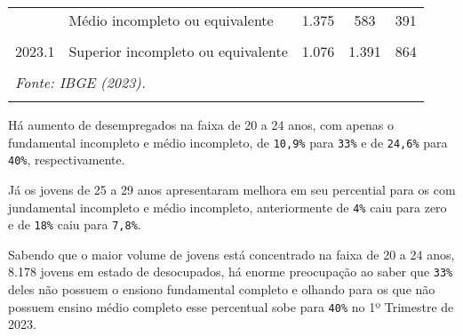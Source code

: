 \documentclass[preprint, 3p,
authoryear]{elsarticle} %
\begin{document}
\begin{longtable}[t]{clccc}
\addlinespace
2023.1 & Médio incompleto ou equivalente & 1.375 & 583 & 391\\
\cellcolor[HTML]{DCDCDC}{2023.1} & \cellcolor[HTML]{DCDCDC}{Médio completo ou equivalente} & \cellcolor[HTML]{DCDCDC}{2.855} & \cellcolor[HTML]{DCDCDC}{3.359} & \cellcolor[HTML]{DCDCDC}{2.817}\\
2023.1 & Superior incompleto ou equivalente & 1.076 & 1.391 & 864\\
\cellcolor[HTML]{DCDCDC}{2023.1} & \cellcolor[HTML]{DCDCDC}{Superior completo} & \cellcolor[HTML]{DCDCDC}{0} & \cellcolor[HTML]{DCDCDC}{149} & \cellcolor[HTML]{DCDCDC}{926}\\
\bottomrule
\multicolumn{5}{l}{\rule{0pt}{1em}\textit{Fonte: IBGE (2023).}}\\
\multicolumn{5}{l}{\rule{0pt}{1em}}\\
\end{longtable}
\endgroup{}

Há aumento de desempregados na faixa de 20 a 24 anos, com apenas o
fundamental incompleto e médio incompleto, de \texttt{10,9\%} para
\texttt{33\%} e de \texttt{24,6\%} para \texttt{40\%}, respectivamente.

Já os jovens de 25 a 29 anos apresentaram melhora em seu percential para
os com jundamental incompleto e médio incompleto, anteriormente de
\texttt{4\%} caiu para zero e de \texttt{18\%} caiu para \texttt{7,8\%}.

Sabendo que o maior volume de jovens está concentrado na faixa de 20 a
24 anos, 8.178 jovens em estado de desocupados, há enorme preocupação ao
saber que \texttt{33\%} deles não possuem o ensiono fundamental completo
e olhando para os que não possuem ensino médio completo esse percentual
sobe para \texttt{40\%} no 1º Trimestre de 2023.

\begingroup\fontsize{9}{11}\selectfont
\end{document}
